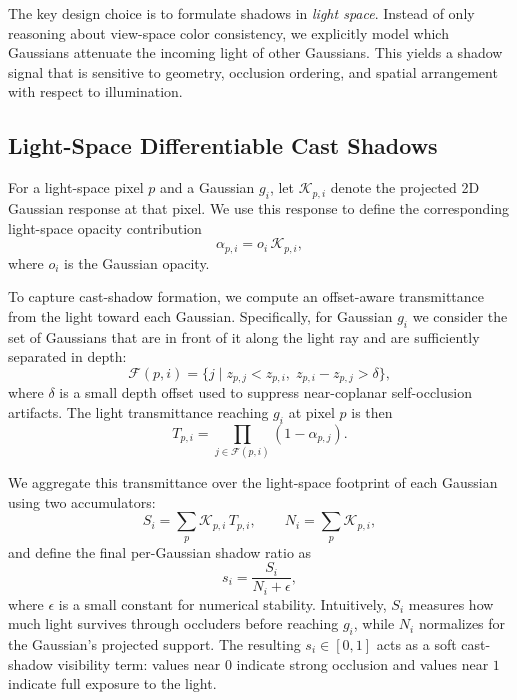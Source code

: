 The key design choice is to formulate shadows in \emph{light space}. Instead of only reasoning about view-space color consistency, we explicitly model which Gaussians attenuate the incoming light of other Gaussians. This yields a shadow signal that is sensitive to geometry, occlusion ordering, and spatial arrangement with respect to illumination.

\subsection{Light-Space Differentiable Cast Shadows}
\label{sec:method_shadow}

For a light-space pixel $p$ and a Gaussian $g_i$, let $\mathcal{K}_{p,i}$ denote the projected 2D Gaussian response at that pixel. We use this response to define the corresponding light-space opacity contribution
\begin{equation}
\alpha_{p,i} = o_i \, \mathcal{K}_{p,i},
\end{equation}
where $o_i$ is the Gaussian opacity.

To capture cast-shadow formation, we compute an offset-aware transmittance from the light toward each Gaussian. Specifically, for Gaussian $g_i$ we consider the set of Gaussians that are in front of it along the light ray and are sufficiently separated in depth:
\begin{equation}
\mathcal{F}(p,i) = \{j \mid z_{p,j} < z_{p,i}, \; z_{p,i}-z_{p,j} > \delta\},
\end{equation}
where $\delta$ is a small depth offset used to suppress near-coplanar self-occlusion artifacts. The light transmittance reaching $g_i$ at pixel $p$ is then
\begin{equation}
T_{p,i} = \prod_{j \in \mathcal{F}(p,i)} (1-\alpha_{p,j}).
\end{equation}

We aggregate this transmittance over the light-space footprint of each Gaussian using two accumulators:
\begin{equation}
S_i = \sum_p \mathcal{K}_{p,i} \, T_{p,i}, \qquad
N_i = \sum_p \mathcal{K}_{p,i},
\end{equation}
and define the final per-Gaussian shadow ratio as
\begin{equation}
s_i = \frac{S_i}{N_i + \epsilon},
\end{equation}
where $\epsilon$ is a small constant for numerical stability. Intuitively, $S_i$ measures how much light survives through occluders before reaching $g_i$, while $N_i$ normalizes for the Gaussian's projected support. The resulting $s_i \in [0,1]$ acts as a soft cast-shadow visibility term: values near $0$ indicate strong occlusion and values near $1$ indicate full exposure to the light.

